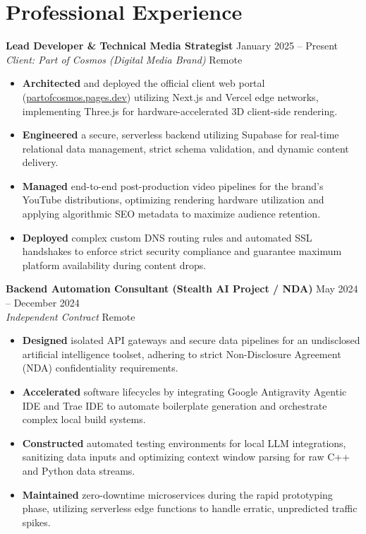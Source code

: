 \documentclass[10pt,letterpaper]{article}
\begin{document}
\section{Professional Experience}
\noindent
\textbf{Lead Developer \& Technical Media Strategist} \hfill January 2025 -- Present \\
\textit{Client: Part of Cosmos (Digital Media Brand)} \hfill Remote
\begin{itemize}
    \item \textbf{Architected} and deployed the official client web portal (\href{https://partofcosmos.pages.dev}{partofcosmos.pages.dev}) utilizing Next.js and Vercel edge networks, implementing Three.js for hardware-accelerated 3D client-side rendering.
    \item \textbf{Engineered} a secure, serverless backend utilizing Supabase for real-time relational data management, strict schema validation, and dynamic content delivery.
    \item \textbf{Managed} end-to-end post-production video pipelines for the brand's YouTube distributions, optimizing rendering hardware utilization and applying algorithmic SEO metadata to maximize audience retention.
    \item \textbf{Deployed} complex custom DNS routing rules and automated SSL handshakes to enforce strict security compliance and guarantee maximum platform availability during content drops.
\end{itemize}

\vspace{6pt}
\noindent
\textbf{Backend Automation Consultant (Stealth AI Project / NDA)} \hfill May 2024 -- December 2024 \\
\textit{Independent Contract} \hfill Remote
\begin{itemize}
    \item \textbf{Designed} isolated API gateways and secure data pipelines for an undisclosed artificial intelligence toolset, adhering to strict Non-Disclosure Agreement (NDA) confidentiality requirements.
    \item \textbf{Accelerated} software lifecycles by integrating Google Antigravity Agentic IDE and Trae IDE to automate boilerplate generation and orchestrate complex local build systems.
    \item \textbf{Constructed} automated testing environments for local LLM integrations, sanitizing data inputs and optimizing context window parsing for raw C++ and Python data streams.
    \item \textbf{Maintained} zero-downtime microservices during the rapid prototyping phase, utilizing serverless edge functions to handle erratic, unpredicted traffic spikes.
\end{itemize}
\end{document}
